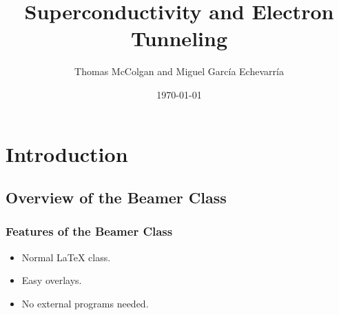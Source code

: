 \documentclass{beamer}
\title{\textbf{Superconductivity and Electron Tunneling}}
\author{Thomas McColgan and Miguel Garc\'ia Echevarr\'ia}
\date{\today}
\begin{document}
\frame{\titlepage}

\section[Outline]{}
\frame{\tableofcontents}

\section{Introduction}
\subsection{Overview of the Beamer Class}
\frame
{
  \frametitle{Features of the Beamer Class}

  \begin{itemize}
  \item<1-> Normal LaTeX class.
  \item<2-> Easy overlays.
  \item<3-> No external programs needed.      
  \end{itemize}
}
\end{document}
